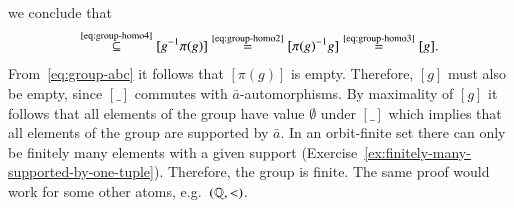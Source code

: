 {\begin{align*}
\end{align*}
we conclude that 
\begin{align*}
 [\pi(g)] \stackrel {\text{\eqref{eq:group-homo4}}} \subseteq [ g^{-1} \pi(g)] \stackrel {\text{\eqref{eq:group-homo2}}}= [\pi(g)^{-1}g] \stackrel {\text{\eqref{eq:group-homo3}}}= [g].
\end{align*}
From~\eqref{eq:group-abc} it follows that $[\pi(g)]$ is empty. Therefore, $[g]$ must also be empty, since $[\_]$ commutes with $\bar a$-automorphisms. 
By maximality of $[g]$ it follows that all elements of the group have value $\emptyset$ under $[\_]$ which implies that all elements of the group are supported by $\bar a$. In an orbit-finite set there can only be finitely many elements with a given support (Exercise~\ref{ex:finitely-many-supported-by-one-tuple}). Therefore, the group is finite.
The same proof would work for some other atoms, e.g.~$(\mathbb Q, <)$.}






{
 
}



